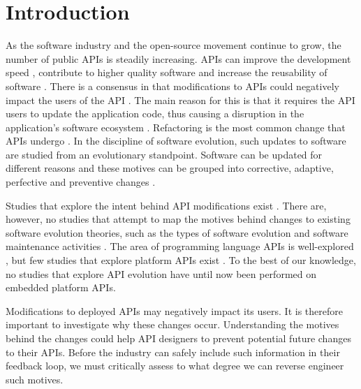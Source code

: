 \documentclass{sig-alternate}
\begin{document}



\section{Introduction} \label{introduction}
As the software industry and the open-source movement continue to grow, the number of public APIs is steadily increasing. APIs can improve the development speed \cite{stylos2006comparing}, contribute to higher quality software \cite{stylos2006comparing} and increase the reusability of software \cite{afonso2012evaluating}. There is a consensus in that modifications to APIs could negatively impact the users of the API \cite{google_talk} \cite{mcdonnell2013empirical} \cite{robbes2012developers} \cite{henning2007api}. The main reason for this is that it requires the API users to update the application code, thus causing a disruption in the application's software ecosystem \cite{messerschmitt2005software}. Refactoring is the most common change that APIs undergo \cite{dig2005role} \cite{xing2006refactoring}. 
In the discipline of software evolution, such updates to software are studied from an evolutionary standpoint. Software can be updated for different reasons and these motives can be grouped into corrective, adaptive, perfective and preventive changes \cite{lientz1980software}. 

Studies that explore the intent behind API modifications exist \cite{hou2011exploring}. There are, however, no studies that attempt to map the motives behind changes to existing software evolution theories, such as the types of software evolution and software maintenance activities \cite{chapin2001types}. The area of programming language APIs is well-explored \cite{hou2011exploring} \cite{shi2011empirical}, but few studies that explore platform APIs exist \cite{robbes2012developers}. To the best of our knowledge, no studies that explore API evolution have until now been performed on embedded platform APIs. 


Modifications to deployed APIs may negatively impact its users. It is therefore important to investigate why these changes occur. Understanding the motives behind the changes could help API designers to  prevent potential future changes to their APIs. Before the industry can safely include such information in their feedback loop, we must critically assess to what degree we can reverse engineer such motives. 
\end{document}
